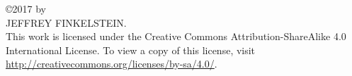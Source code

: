 \thispagestyle{empty}
\setlength{\parindent}{0pt}
\null
\vfill
\copyright 2017 by\\
\uppercase{Jeffrey Finkelstein}.\\
This work is licensed under the Creative Commons Attribution-ShareAlike 4.0 International License. To view a copy of this license, visit \url{http://creativecommons.org/licenses/by-sa/4.0/}.
\newpage
